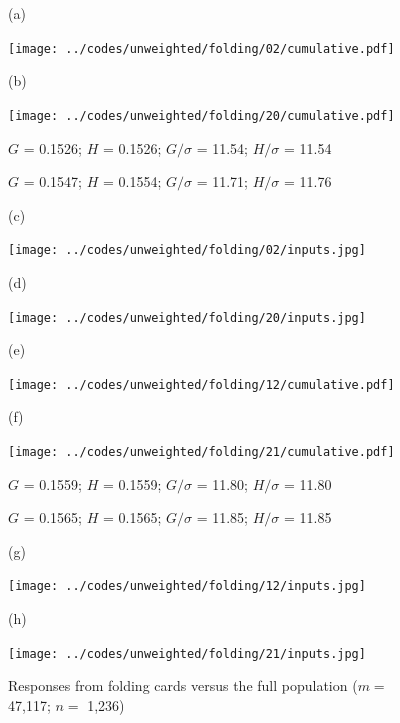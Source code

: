 \documentclass{article}
\newlength{\vertsep}
\newlength{\imsize}
\newlength{\imsized}
\begin{document}
\begin{figure}
\begin{centering}

(a) \parbox{\imsize}{\texttt{[image: ../codes/unweighted/folding/02/cumulative.pdf]}}
\quad\quad
(b) \parbox{\imsize}{\texttt{[image: ../codes/unweighted/folding/20/cumulative.pdf]}}

\parbox{\imsized}{\hfil \footnotesize $G$ = 0.1526; $H$ = 0.1526;
$G/\sigma$ = 11.54; $H/\sigma$ = 11.54}
\parbox{\imsized}{\hfil \footnotesize $G$ = 0.1547; $H$ = 0.1554;
$G/\sigma$ = 11.71; $H/\sigma$ = 11.76}

\vspace{\vertsep}

(c) \parbox{\imsize}{\texttt{[image: ../codes/unweighted/folding/02/inputs.jpg]}}
\quad\quad
(d) \parbox{\imsize}{\texttt{[image: ../codes/unweighted/folding/20/inputs.jpg]}}

\vspace{\vertsep}

(e) \parbox{\imsize}{\texttt{[image: ../codes/unweighted/folding/12/cumulative.pdf]}}
\quad\quad
(f) \parbox{\imsize}{\texttt{[image: ../codes/unweighted/folding/21/cumulative.pdf]}}

\parbox{\imsized}{\hfil \footnotesize $G$ = 0.1559; $H$ = 0.1559;
$G/\sigma$ = 11.80; $H/\sigma$ = 11.80}
\parbox{\imsized}{\hfil \footnotesize $G$ = 0.1565; $H$ = 0.1565;
$G/\sigma$ = 11.85; $H/\sigma$ = 11.85}

\vspace{\vertsep}

(g) \parbox{\imsize}{\texttt{[image: ../codes/unweighted/folding/12/inputs.jpg]}}
\quad\quad
(h) \parbox{\imsize}{\texttt{[image: ../codes/unweighted/folding/21/inputs.jpg]}}

\end{centering}
\caption{Responses from folding cards versus the full population
($m =$ 47,117; $n =$ 1,236)}
\label{folding}
\end{figure}
\end{document}
